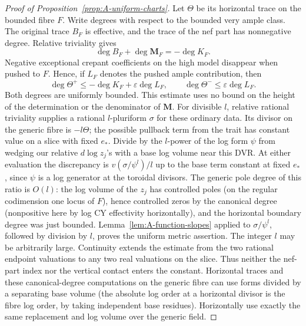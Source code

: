 \begin{proof}[Proof of Proposition~\ref{prop:A-uniform-charts}]
Let \(\Theta\) be its horizontal trace on the bounded fibre \(F\).
Write degrees with respect to the bounded very ample class.
The original trace \(B_F\) is effective, and the trace of the nef part
has nonnegative degree.  Relative triviality gives
\[
 \deg B_F+\deg\mathbf M_F=-\deg K_F .
\]
Negative exceptional crepant coefficients on the high model disappear
when pushed to \(F\).  Hence, if \(L_F\) denotes the pushed ample
contribution, then
\[
 \deg\Theta^+\le -\deg K_F+\varepsilon\deg L_F,
 \qquad
 \deg\Theta^-\le \varepsilon\deg L_F .
\]
Both degrees are uniformly bounded.  This estimate uses no bound on
the height of the determination or the denominator of \(\mathbf M\).
For divisible \(l\), relative rational triviality supplies a rational
\(l\)-pluriform \(\sigma\) for these ordinary data.  Its divisor on the
generic fibre is \(-l\Theta\); the possible pullback term from the trait
has constant value on a slice with fixed \(e_*\).
Divide by the \(l\)-power of the log form \(\psi\) from wedging our relative \(d\log z_j\)'s with a base log volume near this DVR.
At either evaluation the discrepancy is \(v(\sigma/\psi^l)/l\) up to the base term constant at fixed \(e_*\), since \(\psi\) is a log generator at the toroidal divisors.
The generic pole degree of this ratio is \(O(l)\): the log volume of the \(z_j\) has controlled poles (on the regular codimension one locus of \(F\)), hence controlled zeros by the canonical degree (nonpositive here by log CY effectivity horizontally), and the horizontal boundary degree was just bounded.
Lemma~\ref{lem:A-function-slopes} applied to \(\sigma/\psi^l\), followed by division
by \(l\), proves the uniform metric assertion.  The integer \(l\)
may be arbitrarily large.  Continuity extends the estimate from the
two rational endpoint valuations to any two real valuations on the
slice.  Thus neither the nef-part index nor the vertical contact
enters the constant.
Horizontal traces and these canonical-degree computations on the generic fibre can use forms divided by a separating base volume (the absolute log order at a horizontal divisor is the fibre log order, by taking independent base residues).
Horizontally use exactly the same replacement and log volume over the generic field.

\end{proof}

